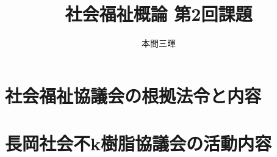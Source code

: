 \documentclass[titlepage,a4paper]{jsarticle}
\title{社会福祉概論 第2回課題}
\author{本間三暉}
\begin{document}
\maketitle
\section{社会福祉協議会の根拠法令と内容}

\section{長岡社会不k樹脂協議会の活動内容}

\end{document}

